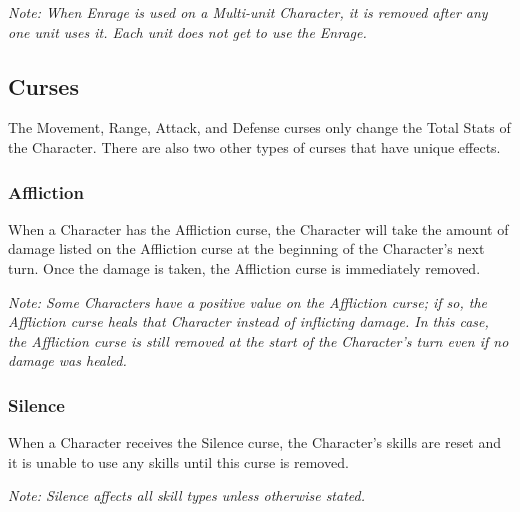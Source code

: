 \documentclass[../main.tex]{subfiles}
\begin{document}
\textit{Note: When Enrage is used on a Multi-unit Character, it is removed after any one unit uses it. Each unit does not get to use the Enrage.}

\subsection{Curses}
The Movement, Range, Attack, and Defense curses only change the Total Stats of the Character. There are also two other types of curses that have unique effects.

\subsubsection{Affliction}
When a Character has the Affliction curse, the Character will take the amount of damage listed on the Affliction curse at the beginning of the Character’s next turn. Once the damage is taken, the Affliction curse is immediately removed.

\textit{Note: Some Characters have a positive value on the Affliction curse; if so, the Affliction curse heals that Character instead of inflicting damage. In this case, the Affliction curse is still removed at the start of the Character’s turn even if no damage was healed.}

\subsubsection{Silence}
When a Character receives the Silence curse, the Character’s skills are reset and it is unable to use any skills until this curse is removed.

\textit{Note: Silence affects all skill types unless otherwise stated.}

\clearpage
\end{document}
